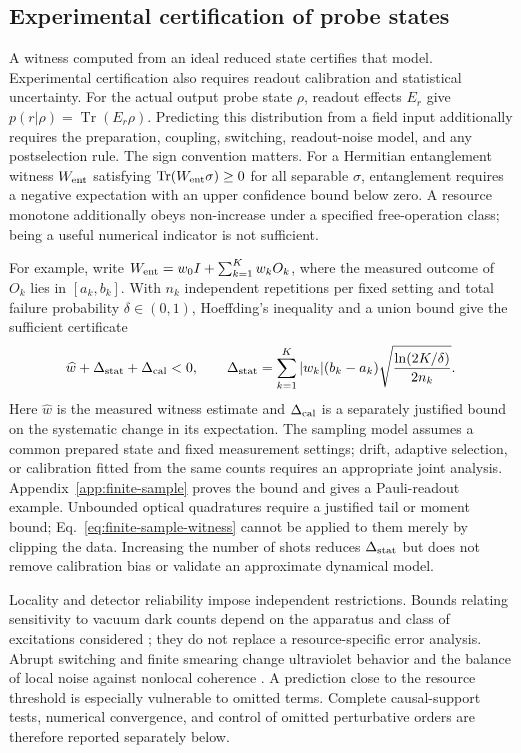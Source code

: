 \documentclass[pdflatex,sn-mathphys-num]{sn-jnl}
\newcommand{\Tr}{\operatorname{Tr}}
\begin{document}
\subsection{Experimental certification of probe states}
\label{sec:reliability}
A witness computed from an ideal reduced state certifies that model. Experimental certification also requires readout calibration and statistical uncertainty. For the actual output probe state $\rho$, readout effects $E_r$ give $p(r|\rho)=\Tr(E_r\rho)$. Predicting this distribution from a field input additionally requires the preparation, coupling, switching, readout-noise model, and any postselection rule. The sign convention matters. For a Hermitian entanglement witness $W_{\rm ent}$ satisfying $\Tr(W_{\rm ent}\sigma)\geq0$ for all separable $\sigma$, entanglement requires a negative expectation with an upper confidence bound below zero. A resource monotone additionally obeys non-increase under a specified free-operation class; being a useful numerical indicator is not sufficient.

For example, write $W_{\rm ent}=w_0 I+\sum_{k=1}^K w_k O_k$, where the measured outcome of $O_k$ lies in $[a_k,b_k]$. With $n_k$ independent repetitions per fixed setting and total failure probability $\delta\in(0,1)$, Hoeffding's inequality and a union bound give the sufficient certificate \cite{Hoeffding1963}
\begin{equation}
\widehat w+\Delta_{\rm stat}+\Delta_{\rm cal}<0,\qquad
\Delta_{\rm stat}=\sum_{k=1}^K|w_k|(b_k-a_k)
\sqrt{\frac{\ln(2K/\delta)}{2n_k}}.
\label{eq:finite-sample-witness}
\end{equation}
Here $\widehat w$ is the measured witness estimate and $\Delta_{\rm cal}$ is a separately justified bound on the systematic change in its expectation. The sampling model assumes a common prepared state and fixed measurement settings; drift, adaptive selection, or calibration fitted from the same counts requires an appropriate joint analysis. Appendix~\ref{app:finite-sample} proves the bound and gives a Pauli-readout example. Unbounded optical quadratures require a justified tail or moment bound; Eq.~\eqref{eq:finite-sample-witness} cannot be applied to them merely by clipping the data. Increasing the number of shots reduces $\Delta_{\rm stat}$ but does not remove calibration bias or validate an approximate dynamical model.

Locality and detector reliability impose independent restrictions. Bounds relating sensitivity to vacuum dark counts depend on the apparatus and class of excitations considered \cite{Falcone2026}; they do not replace a resource-specific error analysis. Abrupt switching and finite smearing change ultraviolet behavior and the balance of local noise against nonlocal coherence \cite{Schlicht2004,LoukoSatz2006,LoukoSatz2008,PozasKerstjens2015}. A prediction close to the resource threshold is especially vulnerable to omitted terms. Complete causal-support tests, numerical convergence, and control of omitted perturbative orders are therefore reported separately below.
\end{document}
